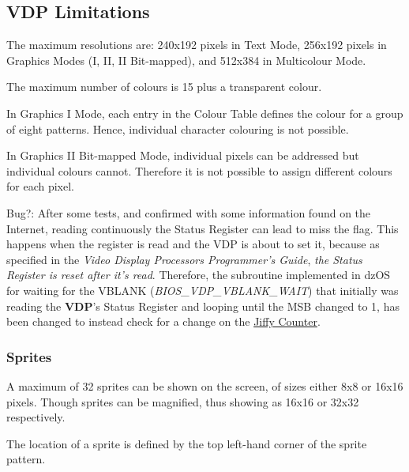     \subsection{VDP Limitations}
    \label{subsec:vdp_limitations}

    The maximum resolutions are: 240x192 pixels in Text Mode, 256x192 pixels in
    Graphics Modes (I, II, II Bit-mapped), and 512x384 in Multicolour Mode.

    The maximum number of colours is 15 plus a transparent colour.

    In Graphics I Mode, each entry in the Colour Table defines the colour for
    a group of eight patterns. Hence, individual character colouring is not
    possible.

    In Graphics II Bit-mapped Mode, individual pixels can be addressed but
    individual colours cannot. Therefore it is not possible to assign different
    colours for each pixel.

    Bug?: After some tests, and confirmed with some information found on the
    Internet, reading continuously the Status Register can lead to miss the flag.
    This happens when the register is read and the VDP is about to set it,
    because as specified in the \textit{Video Display Processors Programmer's
    Guide}\cite{ti1}, \textit{the Status Register is reset after it's read}.
    Therefore, the subroutine implemented in dzOS for waiting for the VBLANK
    (\textit{BIOS\_VDP\_VBLANK\_WAIT}) that initially was reading the
    \textbf{VDP}'s Status Register and looping until the MSB changed to 1, has
    been changed to instead check for a change on the
    \hyperref[subsec:jiffy_counter]{Jiffy Counter}.

    \subsubsection{Sprites}

    A maximum of 32 sprites can be shown on the screen, of sizes either 8x8 or
    16x16 pixels. Though sprites can be magnified, thus showing as 16x16 or
    32x32 respectively.

    The location of a sprite is defined by the top left-hand corner of the
    sprite pattern.

